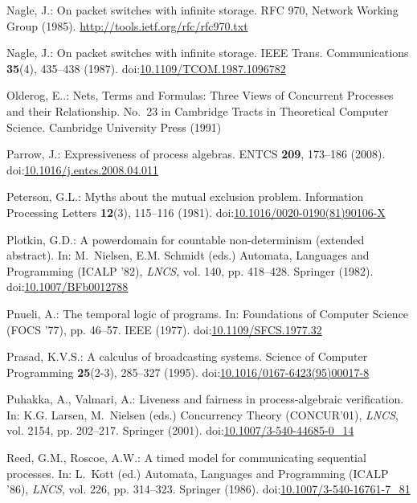 \documentclass[smallcondensed]{svjour3}
\providecommand{\urlalt}[2]{\href{#1}{#2}}
\providecommand{\doi}[1]{doi:\urlalt{http://dx.doi.org/#1}{#1}}
\begin{document}
\begin{thebibliography}{10}
Nagle, J.: On packet switches with infinite storage.
\newblock RFC 970, Network Working Group (1985).
\newblock \urlprefix\url{http://tools.ietf.org/rfc/rfc970.txt}

Nagle, J.: On packet switches with infinite storage.
\newblock IEEE Trans. Communications \textbf{35}(4), 435--438 (1987).
\newblock \doi{10.1109/TCOM.1987.1096782}

Olderog, E.{\Ruediger}.: Nets, Terms and Formulas: Three Views of Concurrent
  Processes and their Relationship.
\newblock No.~23 in Cambridge Tracts in Theoretical Computer Science. Cambridge
  University Press (1991)

Parrow, J.: Expressiveness of process algebras.
\newblock \rm ENTCS \textbf{209}, 173--186 (2008).
\newblock \doi{10.1016/j.entcs.2008.04.011}

Peterson, G.L.: Myths about the mutual exclusion problem.
\newblock Information Processing Letters \textbf{12}(3), 115--116 (1981).
\newblock \doi{10.1016/0020-0190(81)90106-X}

Plotkin, G.D.: A powerdomain for countable non-determinism (extended abstract).
\newblock In: M.~Nielsen, E.M. Schmidt (eds.) Automata, Languages and
  Programming (ICALP '82), \emph{\rm LNCS}, vol. 140, pp. 418--428. Springer
  (1982).
\newblock \doi{10.1007/BFb0012788}

Pnueli, A.: The temporal logic of programs.
\newblock In: Foundations of Computer Science {(FOCS '77)}, pp. 46--57. IEEE
  (1977).
\newblock \doi{10.1109/SFCS.1977.32}

Prasad, K.V.S.: A calculus of broadcasting systems.
\newblock Science of Computer Programming \textbf{25}(2-3), 285--327 (1995).
\newblock \doi{10.1016/0167-6423(95)00017-8}

Puhakka, A., Valmari, A.: Liveness and fairness in process-algebraic
  verification.
\newblock In: K.G. Larsen, M.~Nielsen (eds.) Concurrency Theory (CONCUR'01),
  \emph{\rm LNCS}, vol. 2154, pp. 202--217. Springer (2001).
\newblock \doi{10.1007/3-540-44685-0\_14}

Reed, G.M., Roscoe, A.W.: A timed model for communicating sequential processes.
\newblock In: L.~Kott (ed.) Automata, Languages and Programming (ICALP '86),
  \emph{\rm LNCS}, vol. 226, pp. 314--323. Springer (1986).
\newblock \doi{10.1007/3-540-16761-7\_81}


\end{thebibliography}
\end{document}
